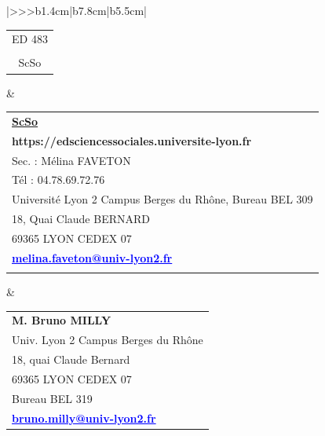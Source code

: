 \begin{center}
\begin{tabular}{|>{\centering}>{}>{\color{txtED}}b{1.4cm}|b{7.8cm}|b{5.5cm}|}
\hline	
	\begin{tabular}{@{}c@{}}
		ED 483\\
		\\
		ScSo\end{tabular}&
	\begin{tabular}{@{}l@{}}
		\\
		\textbf{\underline{ScSo}}\footnotemark[1]\\[.2cm]
		\textcolor{siteED}{\textbf{https://edsciencessociales.universite-lyon.fr}}\\
		Sec. : Mélina FAVETON\\
		Tél : 04.78.69.72.76\\
		Université Lyon 2 Campus Berges du Rhône, Bureau BEL 309\\
		18, Quai Claude BERNARD\\
		69365 LYON CEDEX 07\\
		\textcolor{blue}{\underline{\textbf{melina.faveton@univ-lyon2.fr}}}\\
		\\
	\end{tabular}&
	\begin{tabular}{@{}l@{}}
		\textcolor{txtED}{\textbf{M. Bruno MILLY}}\\
		Univ. Lyon 2 Campus Berges du Rhône\\
		18, quai Claude Bernard\\
		69365 LYON CEDEX 07\\
		Bureau BEL 319\\
		\textcolor{blue}{\underline{\textbf{bruno.milly@univ-lyon2.fr}}}\\
	\end{tabular}\\
	
	\hline	
\end{tabular}
\end{center}


\normalsize
\normalfont
\rmfamily
\restoregeometry
{}
\normalem

\pagestyle{fancy}
\fancyhf{}
\fancyhead[LE]{\sffamily\small\color{chapaccent}\bfseries\thepage}
\fancyhead[RE]{\sffamily\small\textcolor{black!70}{\nouppercase{\leftmark}}}
\fancyhead[LO]{\sffamily\small\textcolor{black!70}{\nouppercase{\rightmark}}}
\fancyhead[RO]{\sffamily\small\color{chapaccent}\bfseries\thepage}

\fancyfoot{}
\setlength{\headheight}{14.5pt}

\dominitoc
\adjustmtc

\tableofcontents

\newpage
